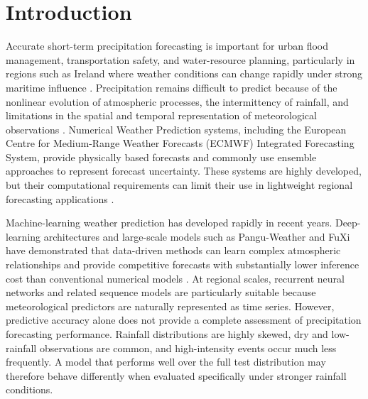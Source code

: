 \documentclass[referee,pdflatex,sn-basic]{sn-jnl}%
\theoremstyle{thmstyleone}%
\theoremstyle{thmstyletwo}%
\theoremstyle{thmstylethree}%
\begin{document}

\maketitle

\section{Introduction}
\label{intro}

Accurate short-term precipitation forecasting is important for urban flood management, transportation safety, and water-resource planning, particularly in regions such as Ireland where weather conditions can change rapidly under strong maritime influence \citep{toth2000comparison}. Precipitation remains difficult to predict because of the nonlinear evolution of atmospheric processes, the intermittency of rainfall, and limitations in the spatial and temporal representation of meteorological observations \citep{magnusson2019ecmwf}. Numerical Weather Prediction systems, including the European Centre for Medium-Range Weather Forecasts (ECMWF) Integrated Forecasting System, provide physically based forecasts and commonly use ensemble approaches to represent forecast uncertainty. These systems are highly developed, but their computational requirements can limit their use in lightweight regional forecasting applications \citep{haiden2021evaluation}.

Machine-learning weather prediction has developed rapidly in recent years. Deep-learning architectures and large-scale models such as Pangu-Weather and FuXi have demonstrated that data-driven methods can learn complex atmospheric relationships and provide competitive forecasts with substantially lower inference cost than conventional numerical models \citep{bi2022pangu,chen2023fuxi}. At regional scales, recurrent neural networks and related sequence models are particularly suitable because meteorological predictors are naturally represented as time series. However, predictive accuracy alone does not provide a complete assessment of precipitation forecasting performance. Rainfall distributions are highly skewed, dry and low-rainfall observations are common, and high-intensity events occur much less frequently. A model that performs well over the full test distribution may therefore behave differently when evaluated specifically under stronger rainfall conditions.
\end{document}
